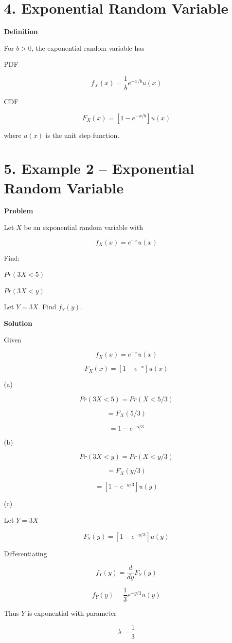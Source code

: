 \documentclass[12pt]{article}
\begin{document}
\section*{4. Exponential Random Variable}

\textbf{Definition}

For $b>0$, the exponential random variable has

PDF

\[
f_X(x)=\frac{1}{b}e^{-x/b}u(x)
\]

CDF

\[
F_X(x)=[1-e^{-x/b}]u(x)
\]

where $u(x)$ is the unit step function.

\section*{5. Example 2 – Exponential Random Variable}

\textbf{Problem}

Let $X$ be an exponential random variable with

\[
f_X(x)=e^{-x}u(x)
\]

Find:

$Pr(3X<5)$

$Pr(3X<y)$

Let $Y=3X$. Find $f_Y(y)$.

\textbf{Solution}

Given

\[
f_X(x)=e^{-x}u(x)
\]

\[
F_X(x)=[1-e^{-x}]u(x)
\]

(a)

\[
Pr(3X<5)=Pr(X<5/3)
\]

\[
=F_X(5/3)
\]

\[
=1-e^{-5/3}
\]

(b)

\[
Pr(3X<y)=Pr(X<y/3)
\]

\[
=F_X(y/3)
\]

\[
=[1-e^{-y/3}]u(y)
\]

(c)

Let $Y=3X$

\[
F_Y(y)=[1-e^{-y/3}]u(y)
\]

Differentiating

\[
f_Y(y)=\frac{d}{dy}F_Y(y)
\]

\[
f_Y(y)=\frac{1}{3}e^{-y/3}u(y)
\]

Thus $Y$ is exponential with parameter

\[
\lambda=\frac{1}{3}
\]
\end{document}
